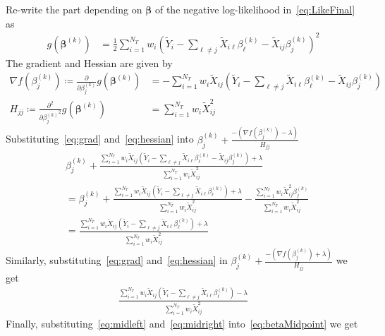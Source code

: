 \documentclass[12pt,letter]{article}\usepackage[]{graphicx}\usepackage[]{color}
\newcommand{\Xtilde}{\widetilde{X}}
\newcommand{\Ytilde}{\widetilde{Y}}
\newcommand{\bbeta}{\boldsymbol{\beta}}
\begin{document}
Re-write the part depending on $\bbeta$ of the negative log-likelihood in~\eqref{eq:LikeFinal} as
\begin{align}
	g(\bbeta^{(k)}) & = \frac{1}{2} \sum_{i=1}^{N_T} w_i\left(  \Ytilde_i - \sum_{\ell \neq j}\Xtilde_{i\ell} \beta_\ell^{(k)} - \Xtilde_{ij}\beta_j^{(k)} \right) ^2
\end{align}
The gradient and Hessian are given by
\begin{align}
	\nabla f(\beta_j^{(k)}) \coloneqq \frac{\partial}{\partial \beta_j^{(k)}}g(\bbeta^{(k)}) & = - \sum_{i=1}^{N_T} w_i \Xtilde_{ij}\left(  \Ytilde_i - \sum_{\ell \neq j}\Xtilde_{i\ell} \beta_\ell^{(k)} - \Xtilde_{ij}\beta_j^{(k)} \right)  \label{eq:grad}\\
	H_{jj} \coloneqq \frac{\partial^2}{\partial {\beta_j^{(k)}}^2}g(\bbeta^{(k)}) & = \sum_{i=1}^{N_T} w_i \Xtilde_{ij}^2  \label{eq:hessian}
\end{align}
Substituting~\eqref{eq:grad} and~\eqref{eq:hessian} into $\beta_j^{(k)}+ \frac{-(\nabla f(\beta_j^{(k)}) - \lambda)}{H_{jj}}$ %
\begin{align}
	& \beta_j^{(k)}+ \frac{  \sum_{i=1}^{N_T} w_i \Xtilde_{ij}\left(  \Ytilde_i - \sum_{\ell \neq j}\Xtilde_{i\ell} \beta_\ell^{(k)} - \Xtilde_{ij}\beta_j^{(k)} \right)  + \lambda }{\sum_{i=1}^{N_T} w_i \Xtilde_{ij}^2} \nonumber \\
	& = \beta_j^{(k)}+ \frac{ \sum_{i=1}^{N_T} w_i \Xtilde_{ij}\left(  \Ytilde_i - \sum_{\ell \neq j}\Xtilde_{i\ell} \beta_\ell^{(k)} \right) + \lambda}{\sum_{i=1}^{N_T} w_i \Xtilde_{ij}^2} - \frac{\sum_{i=1}^{N_T} w_i \Xtilde_{ij}^2\beta_j^{(k)}  }{\sum_{i=1}^{N_T} w_i \Xtilde_{ij}^2} \nonumber \\
	& =  \frac{  \sum_{i=1}^{N_T} w_i \Xtilde_{ij}\left(  \Ytilde_i - \sum_{\ell \neq j}\Xtilde_{i\ell} \beta_\ell^{(k)} \right) + \lambda}{\sum_{i=1}^{N_T} w_i \Xtilde_{ij}^2} \label{eq:midleft}
\end{align}
Similarly, substituting~\eqref{eq:grad} and~\eqref{eq:hessian} in $\beta_j^{(k)}+ \frac{-(\nabla f(\beta_j^{(k)}) + \lambda)}{H_{jj}}$ we get
\begin{align}
	\frac{  \sum_{i=1}^{N_T} w_i \Xtilde_{ij}\left(  \Ytilde_i - \sum_{\ell \neq j}\Xtilde_{i\ell} \beta_\ell^{(k)} \right) - \lambda}{\sum_{i=1}^{N_T} w_i \Xtilde_{ij}^2} \label{eq:midright}
\end{align}
Finally, substituting~\eqref{eq:midleft} and~\eqref{eq:midright} into~\eqref{eq:betaMidpoint} we get
\end{document}
